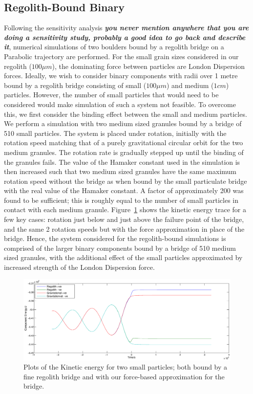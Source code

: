 \documentclass[letterpaper, preprint, paper,11pt]{AAS}	%
\begin{document}
\subsection{Regolith-Bound Binary}
Following the sensitivity analysis \textbf{\emph{you never mention anywhere that you are doing a sensitivity study, probably a good idea to go back and describe it}}, numerical simulations of two boulders bound by a regolith bridge on a Parabolic trajectory are performed. For the small grain sizes considered in our regolith ($100\mu m$), the dominating force between particles are London Dispersion forces. Ideally, we wish to consider binary components with radii over 1 metre bound by a regolith bridge consisting of small ($100\mu m$) and medium ($1cm$) particles. However, the number of small particles that would need to be considered would make simulation of such a system not feasible. To overcome this, we first consider the binding effect between the small and medium particles. We perform a simulation with two medium sized granules bound by a bridge of 510 small particles. The system is placed under rotation, initially with the rotation speed matching that of a purely gravitational circular orbit for the two medium granules. The rotation rate is gradually stepped up until the binding of the granules fails. The value of the Hamaker\cite{hamaker} constant used in the simulation is then increased such that two medium sized granules have the same maximum rotation speed without the bridge as when bound by the small particulate bridge with the real value of the Hamaker\cite{hamaker} constant. A factor of approximately 200 was found to be sufficient; this is roughly equal to the number of small particles in contact with each medium granule. Figure~\ref{fig:dustyspin} shows the kinetic energy trace for a few key cases: rotation just below and just above the failure point of the bridge, and the same 2 rotation speeds but with the force approximation in place of the bridge. Hence, the system considered for the regolith-bound simulations is comprised of the larger binary components bound by a bridge of 510 medium sized granules, with the additional effect of the small particles approximated by increased strength of the London Dispersion force.  
\begin{figure}[H]
\centering
\centerline{\includegraphics[width=1.2\textwidth]{regolith_v_gravitational.eps}} 
\caption{Plots of the Kinetic energy for two small particles; both bound by a fine regolith bridge and with our force-based approximation for the bridge.} 
\label{fig:dustyspin}
\end{figure}
  
\end{document}
